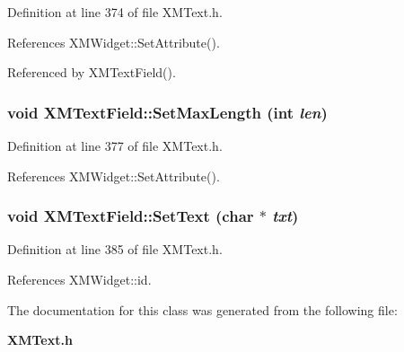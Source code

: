 Definition at line 374 of file XMText.h.

References XMWidget::Set\-Attribute().

Referenced by XMText\-Field().
\subsubsection{\setlength{\rightskip}{0pt plus 5cm}void XMText\-Field::Set\-Max\-Length (int {\em len})\hspace{0.3cm}{\tt  [inline]}}\label{classXMTextField_a5}




Definition at line 377 of file XMText.h.

References XMWidget::Set\-Attribute().
\subsubsection{\setlength{\rightskip}{0pt plus 5cm}void XMText\-Field::Set\-Text (char $\ast$ {\em txt})\hspace{0.3cm}{\tt  [inline]}}\label{classXMTextField_a8}




Definition at line 385 of file XMText.h.

References XMWidget::id.

The documentation for this class was generated from the following file:\begin{CompactItemize}
\item 
{\bf XMText.h}\end{CompactItemize}
